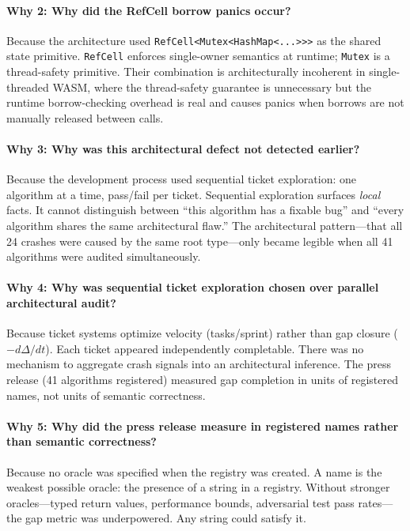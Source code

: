 \documentclass[11pt,a4paper]{article}
\theoremstyle{definition}
\begin{document}
\paragraph{Why 2: Why did the RefCell borrow panics occur?}
Because the architecture used \texttt{RefCell<Mutex<HashMap<...>>>} as the shared state primitive. \texttt{RefCell} enforces single-owner semantics at runtime; \texttt{Mutex} is a thread-safety primitive. Their combination is architecturally incoherent in single-threaded WASM, where the thread-safety guarantee is unnecessary but the runtime borrow-checking overhead is real and causes panics when borrows are not manually released between calls.

\paragraph{Why 3: Why was this architectural defect not detected earlier?}
Because the development process used sequential ticket exploration: one algorithm at a time, pass/fail per ticket. Sequential exploration surfaces \emph{local} facts. It cannot distinguish between ``this algorithm has a fixable bug'' and ``every algorithm shares the same architectural flaw.'' The architectural pattern---that all 24 crashes were caused by the same root type---only became legible when all 41 algorithms were audited simultaneously.

\paragraph{Why 4: Why was sequential ticket exploration chosen over parallel architectural audit?}
Because ticket systems optimize velocity (tasks/sprint) rather than gap closure ($-d\Delta/dt$). Each ticket appeared independently completable. There was no mechanism to aggregate crash signals into an architectural inference. The press release (41 algorithms registered) measured gap completion in units of registered names, not units of semantic correctness.

\paragraph{Why 5: Why did the press release measure in registered names rather than semantic correctness?}
Because no oracle was specified when the registry was created. A name is the weakest possible oracle: the presence of a string in a registry. Without stronger oracles---typed return values, performance bounds, adversarial test pass rates---the gap metric was underpowered. Any string could satisfy it.
\end{document}
